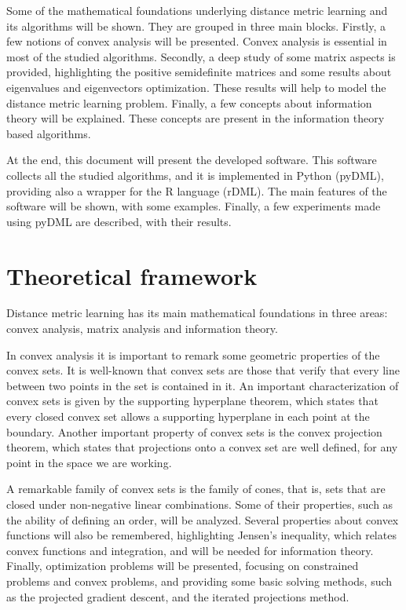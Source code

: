 Some of the mathematical foundations underlying distance metric learning and its algorithms will be shown. They are grouped in three main blocks. Firstly, a few notions of convex analysis will be presented. Convex analysis is essential in most of the studied algorithms. Secondly, a deep study of some matrix aspects is provided, highlighting the positive semidefinite matrices and some results about eigenvalues and eigenvectors optimization. These results will help to model the distance metric learning problem. Finally, a few concepts about information theory will be explained. These concepts are present in the information theory based algorithms.

At the end, this document will present the developed software. This software collects all the studied algorithms, and it is implemented in Python (pyDML), providing also a wrapper for the R language (rDML). The main features of the software will be shown, with some examples. Finally, a few experiments made using pyDML are described, with their results.

\section*{Theoretical framework}

Distance metric learning has its main mathematical foundations in three areas: convex analysis, matrix analysis and information theory.

In convex analysis it is important to remark some geometric properties of the convex sets. It is well-known that convex sets are those that verify that every line between two points in the set is contained in it. An important characterization of convex sets is given by the supporting hyperplane theorem, which states that every closed convex set allows a supporting hyperplane in each point at the boundary. Another important property of convex sets is the convex projection theorem, which states that projections onto a convex set are well defined, for any point in the space we are working.

A remarkable family of convex sets is the family of cones, that is, sets that are closed under non-negative linear combinations. Some of their properties, such as the ability of defining an order, will be analyzed. Several properties about convex functions will also be remembered, highlighting Jensen's inequality, which relates convex functions and integration, and will be needed for information theory. Finally, optimization problems will be presented, focusing on constrained problems and convex problems, and providing some basic solving methods, such as the projected gradient descent, and the iterated projections method.

